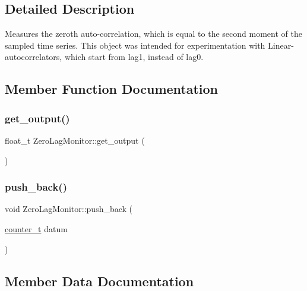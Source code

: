 \subsection{Detailed Description}
Measures the zeroth auto-\/correlation, which is equal to the second moment of the sampled time series. This object was intended for experimentation with Linear-\/autocorrelators, which start from lag1, instead of lag0. 

\subsection{Member Function Documentation}
\mbox{\label{classZeroLagMonitor_ae55b5b21f78fd93d1c8afc95bba69ba4}} 
\subsubsection{\texorpdfstring{get\+\_\+output()}{get\_output()}}
{\footnotesize\ttfamily float\+\_\+t Zero\+Lag\+Monitor\+::get\+\_\+output (\begin{DoxyParamCaption}{ }\end{DoxyParamCaption})\hspace{0.3cm}{\ttfamily [inline]}}

\mbox{\label{classZeroLagMonitor_a22be76548cef864fba0a9c9125a57cce}} 
\subsubsection{\texorpdfstring{push\+\_\+back()}{push\_back()}}
{\footnotesize\ttfamily void Zero\+Lag\+Monitor\+::push\+\_\+back (\begin{DoxyParamCaption}\item[{\hyperlink{types_8hpp_a22f279793847eba127de149437848c48}{counter\+\_\+t}}]{datum }\end{DoxyParamCaption})\hspace{0.3cm}{\ttfamily [inline]}}



\subsection{Member Data Documentation}
\mbox{\label{classZeroLagMonitor_ad155a1aa85eba7a03b65c15649228006}} 
